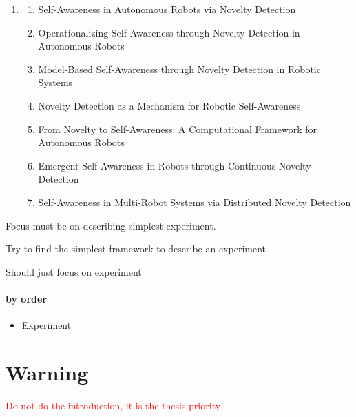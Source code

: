 \documentclass[a4paper]{article}
\title{}
\date{}
\begin{document}
    \maketitle
    
    
    \begin{enumerate}
        \item
            \begin{enumerate}
                      \item Self-Awareness in Autonomous Robots via Novelty Detection
                      \item Operationalizing Self-Awareness through Novelty Detection in Autonomous Robots
                      \item Model-Based Self-Awareness through Novelty Detection in Robotic Systems
                      \item Novelty Detection as a Mechanism for Robotic Self-Awareness
                      \item From Novelty to Self-Awareness: A Computational Framework for Autonomous Robots
                      \item Emergent Self-Awareness in Robots through Continuous Novelty Detection
                      \item Self-Awareness in Multi-Robot Systems via Distributed Novelty Detection
            \end{enumerate}
    \end{enumerate}
    
    Focus must be on describing simplest experiment.
    
    Try to find the simplest framework to describe an experiment
    
    Should just focus on experiment
    
    \paragraph{by order}
        \begin{itemize}
            \item Experiment
        \end{itemize}
    
    
    \section{Warning}
    \textcolor{red}{Do not do the introduction, it is the thesis priority}
    
    
\end{document}
